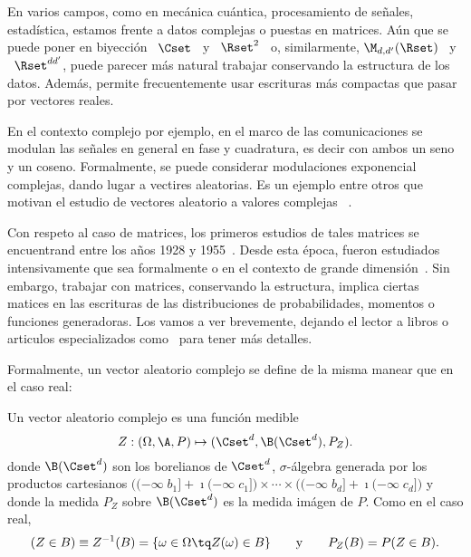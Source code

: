 \label{Sec:MP:VectoresComplejosMatricesAleatorias}

En  varios campos, como  en mec\'anica  cu\'antica, procesamiento  de se\~nales,
estad\'istica, estamos frente a datos complejas o puestas en matrices. A\'un que
se  puede poner en  biyecci\'on \  $\Cset$ \  y \  $\Rset^2$ \  o, similarmente,
$\M_{d,d'}(\Rset)$ \  y \ $\Rset^{d  d'}$, puede parecer m\'as  natural trabajar
conservando la  estructura de los  datos. Adem\'as, permite  frecuentemente usar
escrituras m\'as compactas que pasar por vectores reales.

En  el contexto  complejo por  ejemplo,  en el  marco de  las comunicaciones  se
modulan las  se\~nales en general  en fase y  cuadratura, es decir con  ambos un
seno  y un coseno.   Formalmente, se  puede considerar  modulaciones exponencial
complejas,  dando lugar a  vectires aleatorias.  Es un  ejemplo entre  otros que
motivan  el  estudio  de  vectores aleatorio  a  valores  complejas~\cite{Lap17,
  SchSch03, EriKoi06} .

Con respeto  al caso  de matrices,  los primeros estudios  de tales  matrices se
encuentrand entre  los a\~nos 1928 y 1955~\cite{Wis28,  NeuGol47, Wig55}.  Desde
esta  \'epoca, fueron  estudiados intensivamente  que  sea formalmente  o en  el
contexto de grande dimensi\'on~\cite{MarPas67, BouPas95}.  Sin embargo, trabajar
con  matrices, \ie  conservando la  estructura, implica  ciertas matices  en las
escrituras  de  las  distribuciones  de  probabilidades,  momentos  o  funciones
generadoras.  Los vamos a ver brevemente, dejando el lector a libros o articulos
especializados  como~\cite{AkeBai15,  GupNag99,  AndGui10,  LivNov18,  EdeRao05,
  Meh04, Car83, Daw81, MezSna08, TulVer04} para tener m\'as detalles.
%
%


\label{Ssec:MP:VAComplejos}

Formalmente, un vector aleatorio complejo se define de la misma manear que en el
caso real:
%
\begin{definicion}
\label{Def:MP:VectorAleatorioComplejo}
%
  Un vector aleatorio complejo es una funci\'on medible
  \[
  Z: (\Omega,\A,P) \mapsto (\Cset^d,\B(\Cset^d),P_Z).
  \]
  donde  $\B(\Cset^d)$  son  los  borelianos  de  $\Cset^d$,  $\sigma$-\'algebra
  generada  por los  productos  cartesianos  $\big( (-\infty  \;  b_1] +  \imath
  (-\infty \;  c_1] \big) \times \cdots  \times \big( (-\infty \;  b_d] + \imath
  (-\infty \;  c_d] \big)$  y donde  la medida $P_Z$  sobre $\B(\Cset^d)$  es la
  medida im\'agen de $P$. Como en el caso real,
  \[
  (Z \in  B) \equiv  Z^{-1}(B) =  \{ \omega \in  \Omega \tq  Z(\omega) \in  B \}
  \qquad \mbox{y} \qquad P_Z(B) = P(Z \in B).
  \]
\end{definicion}

